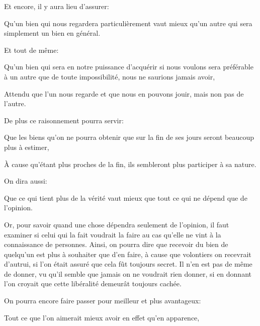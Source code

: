 \bigbreak

Et encore, il y aura lieu d'assurer:

\begin{lieu}
  Qu'un bien qui nous regardera particulièrement vaut mieux qu'un autre qui sera simplement un bien en général.
\end{lieu}

Et tout de même:

\begin{lieu}
  Qu'un bien qui sera en notre puissance d'acquérir si nous voulons sera préférable à un autre que de toute
  impossibilité, nous ne saurions jamais avoir,
\end{lieu}

Attendu que l'un nous regarde et que nous en pouvons jouir, mais non pas de l'autre.

\bigbreak

De plus ce raisonnement pourra servir:

\begin{lieu}
  Que les biens qu'on ne pourra obtenir que sur la fin de ses jours seront beaucoup plus à estimer,
\end{lieu}

À cause qu'étant plus proches de la fin, ils sembleront plus participer à sa nature.

On dira aussi:

\begin{lieu}
  Que ce qui tient plus de la vérité vaut mieux que tout ce qui ne dépend que de l’opinion.
\end{lieu}

Or, pour savoir quand une chose dépendra seulement de l'opinion, il faut examiner si celui qui la fait voudrait la
faire au cas qu'elle ne vint à la connaissance de personnes. Ainsi, on pourra dire que recevoir du bien de quelqu'un
est plus à souhaiter que d'en faire, à cause que volontiers on recevrait d'autrui, si l'on était assuré que cela fût
toujours secret. Il n'en est pas de même de donner, vu qu'il semble que jamais on ne voudrait rien donner, si en donnant
l'on croyait que cette libéralité demeurât toujours cachée.

\bigbreak

On pourra encore faire passer pour meilleur et plus avantageux:

\begin{lieu}
  Tout ce que l'on aimerait mieux avoir en effet qu'en apparence,
\end{lieu}

